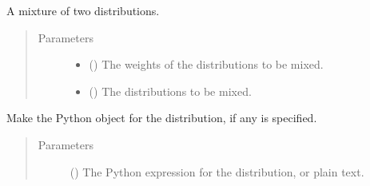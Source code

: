 \documentclass[letterpaper,10pt,english]{sphinxmanual}
\begin{document}
\begin{fulllineitems}
\label{\detokenize{doc-src/tyche:tyche.Distributions.mixture}}
A mixture of two distributions.
\begin{quote}\begin{description}
\item[{Parameters}] \leavevmode\begin{itemize}
\item {} 
 () \textendash{} The weights of the distributions to be mixed.

\item {} 
 () \textendash{} The distributions to be mixed.

\end{itemize}

\end{description}\end{quote}

\end{fulllineitems}


\begin{fulllineitems}
\label{\detokenize{doc-src/tyche:tyche.Distributions.parse_distribution}}
Make the Python object for the distribution, if any is specified.
\begin{quote}\begin{description}
\item[{Parameters}] \leavevmode
{} () \textendash{} The Python expression for the distribution, or plain text.

\end{description}\end{quote}

\end{fulllineitems}
\end{document}
